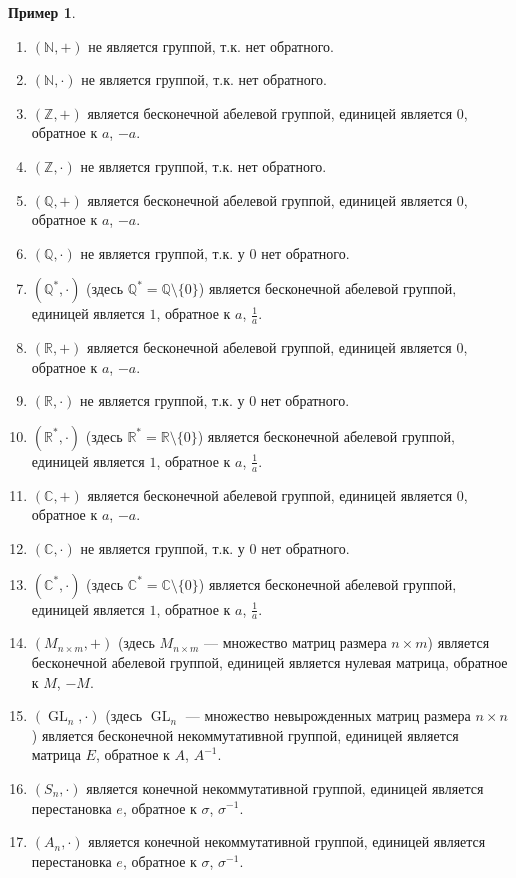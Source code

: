 \documentclass[12pt, titlepage, oneside]{amsbook}
\newcommand{\GL}{\operatorname{GL}}
\newcommand{\NN}{\mathbb{N}}
\newcommand{\ZZ}{\mathbb{Z}}
\newcommand{\RR}{\mathbb{R}}
\newcommand{\CC}{\mathbb{C}}
\newcommand{\QQ}{\mathbb{Q}}
\theoremstyle{definition}
\newtheorem{example}[theorem]{Пример}
\theoremstyle{remark}
\begin{document}
\begin{example}
	\begin{enumerate}
		\item $(\NN,+)$ не является группой, т.к. нет обратного.
		\item $(\NN,\cdot)$ не является группой, т.к. нет обратного.
		\item $(\ZZ,+)$ является бесконечной абелевой группой, единицей является $0$, обратное к $a$, $-a$.
		\item $(\ZZ,\cdot)$ не является группой, т.к. нет обратного.
		\item $(\QQ,+)$ является бесконечной абелевой группой, единицей является $0$, обратное к $a$, $-a$.
		\item $(\QQ,\cdot)$ не является группой, т.к. у $0$ нет обратного.
		\item $(\QQ^*,\cdot)$ (здесь $\QQ^*=\QQ \setminus\{0\}$) является бесконечной абелевой группой, единицей является $1$, обратное к $a$, $\frac{1}{a}$.
		\item $(\RR,+)$ является бесконечной абелевой группой, единицей является $0$, обратное к $a$, $-a$.
		\item $(\RR,\cdot)$ не является группой, т.к. у $0$ нет обратного.
		\item $(\RR^*,\cdot)$ (здесь $\RR^*=\RR \setminus\{0\}$) является бесконечной абелевой группой, единицей является $1$, обратное к $a$, $\frac{1}{a}$.
		\item $(\CC,+)$ является бесконечной абелевой группой, единицей является $0$, обратное к $a$, $-a$.
		\item $(\CC,\cdot)$ не является группой, т.к. у $0$ нет обратного.
		\item $(\CC^*,\cdot)$ (здесь $\CC^*=\CC \setminus\{0\}$) является бесконечной абелевой группой, единицей является $1$, обратное к $a$, $\frac{1}{a}$.
		\item $(M_{n\times m},+)$ (здесь $M_{n\times m}$ --- множество матриц размера $n\times m$) является бесконечной абелевой группой, единицей является нулевая матрица, обратное к $M$, $-M$.
		\item $(\GL_n,\cdot)$ (здесь $\GL_n$ --- множество невырожденных матриц размера $n\times n$) является бесконечной некоммутативной группой, единицей является матрица $E$, обратное к $A$, $A^{-1}$.
		\item $(S_n,\cdot)$ является конечной некоммутативной группой, единицей является перестановка $e$, обратное к $\sigma$, $\sigma^{-1}$.
		\item $(A_n,\cdot)$ является конечной некоммутативной группой, единицей является перестановка $e$, обратное к $\sigma$, $\sigma^{-1}$.
	\end{enumerate}
\end{example}
\end{document}
